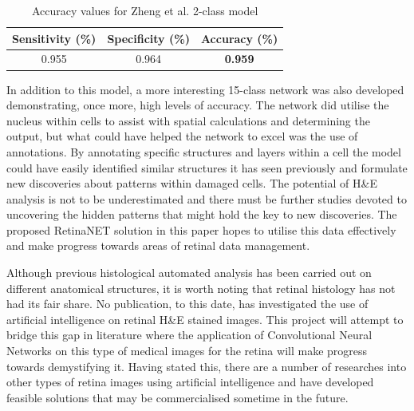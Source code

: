 \documentclass[a4paper]{article}
\begin{document}
        \begin{table}[!h]
            \centering
                \begin{tabular}{||c c c||} 
                \hline
                \textbf{Sensitivity (\%)} & \textbf{Specificity (\%)} & \textbf{Accuracy (\%)} \\ 
                \hline\hline
                0.955 & 0.964  & \textbf{0.959} \\
                \hline
                \end{tabular}
            \caption{\label{fig:2} Accuracy values for Zheng et al. 2-class model}
        \end{table}

        In addition to this model, a more interesting 15-class network was also developed demonstrating, once more, high levels of accuracy. The network did utilise the nucleus within cells to assist with spatial calculations and determining the output, but what could have helped the network to excel was the use of annotations. By annotating specific structures and layers within a cell the model could have easily identified similar structures it has seen previously and formulate new discoveries about patterns within damaged cells. The potential of H\&E analysis is not to be underestimated and there must be further studies devoted to uncovering the hidden patterns that might hold the key to new discoveries. The proposed RetinaNET solution in this paper hopes to utilise this data effectively and make progress towards areas of retinal data management.
        \vspace{3mm}

        Although previous histological automated analysis has been carried out on different anatomical structures, it is worth noting that retinal histology has not had its fair share. No publication, to this date, has investigated the use of artificial intelligence on retinal H\&E stained images. This project will attempt to bridge this gap in literature where the application of Convolutional Neural Networks on this type of medical images for the retina will make progress towards demystifying it. Having stated this, there are a number of researches into other types of retina images using artificial intelligence and have developed feasible solutions that may be commercialised sometime in the future.
        \vspace{3mm}
\end{document}
